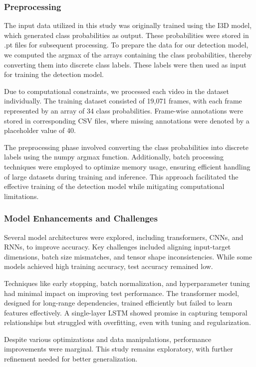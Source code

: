 \documentclass{article}
\begin{document}
\subsubsection{Preprocessing}
The input data utilized in this study was originally trained using the I3D model, which generated class probabilities as output. These probabilities were stored in .pt files for subsequent processing. To prepare the data for our detection model, we computed the argmax of the arrays containing the class probabilities, thereby converting them into discrete class labels. These labels were then used as input for training the detection model.

Due to computational constraints, we processed each video in the dataset individually. The training dataset consisted of 19,071 frames, with each frame represented by an array of 34 class probabilities. Frame-wise annotations were stored in corresponding CSV files, where missing annotations were denoted by a placeholder value of 40.

The preprocessing phase involved converting the class probabilities into discrete labels using the numpy argmax function. Additionally, batch processing techniques were employed to optimize memory usage, ensuring efficient handling of large datasets during training and inference. This approach facilitated the effective training of the detection model while mitigating computational limitations.
\subsubsection{Model Enhancements and Challenges}
Several model architectures were explored, including transformers, CNNs, and RNNs, to improve accuracy. Key challenges included aligning input-target dimensions, batch size mismatches, and tensor shape inconsistencies. While some models achieved high training accuracy, test accuracy remained low.

Techniques like early stopping, batch normalization, and hyperparameter tuning had minimal impact on improving test performance. The transformer model, designed for long-range dependencies, trained efficiently but failed to learn features effectively. A single-layer LSTM showed promise in capturing temporal relationships but struggled with overfitting, even with tuning and regularization.

Despite various optimizations and data manipulations, performance improvements were marginal. This study remains exploratory, with further refinement needed for better generalization.
\end{document}

